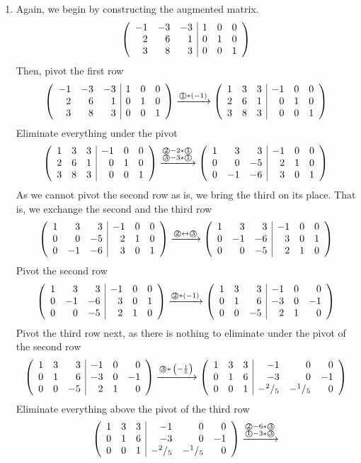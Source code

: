 \documentclass[8pt]{article} %
\newcommand{\myexplain}[3]{#1\xrightarrow{\text{#2}}#3}
\newcommand{\myexplainf}[4]{#1\xrightarrow{\begin{subarray}{c}\text{#2}\\\text{#3}\end{subarray}}#4}
\newcommand{\myfrac}[2]{^#1/_#2}
\begin{document}
\begin{description}
{\begin{enumerate}[label=(\alph*)]
			\item Again, we begin by constructing the augmented matrix.
				\[\left(\begin{array}{rrr|rrr}-1&-3&-3&1&0&0\\2&6&1&0&1&0\\3&8&3&0&0&1\end{array}\right)\]
				Then, pivot the first row
				\[\myexplain
				{\mymat{-1&-3&-3&1&0&0\\2&6&1&0&1&0\\3&8&3&0&0&1}}
				{\textcircled{1}$*(-1)$}
				{\mymat{1&3&3&-1&0&0\\2&6&1&0&1&0\\3&8&3&0&0&1}}
				\]
				Eliminate everything under the pivot
				\[\myexplainf
				{\mymat{1&3&3&-1&0&0\\2&6&1&0&1&0\\3&8&3&0&0&1}}
				{\textcircled{2}$-2*$\textcircled{1}}
				{\textcircled{3}$-3*$\textcircled{1}}
				{\mymat{1&3&3&-1&0&0\\0&0&-5&2&1&0\\0&-1&-6&3&0&1}}
				\]
				As we cannot pivot the second row as is, we bring the third on its place. That is, we exchange the second
				and the third row
				\[\myexplain
				{\mymat{1&3&3&-1&0&0\\0&0&-5&2&1&0\\0&-1&-6&3&0&1}}
				{\textcircled{2}$\leftrightarrow$\textcircled{3}}
				{\mymat{1&3&3&-1&0&0\\0&-1&-6&3&0&1\\0&0&-5&2&1&0}}
				\]
				Pivot the second row
				\[\myexplain
				{\mymat{1&3&3&-1&0&0\\0&-1&-6&3&0&1\\0&0&-5&2&1&0}}
				{\textcircled{2}$*(-1)$}
				{\mymat{1&3&3&-1&0&0\\0&1&6&-3&0&-1\\0&0&-5&2&1&0}}
				\]
				Pivot the third row next, as there is nothing to eliminate under the pivot of the second row
				\[\myexplain
				{\mymat{1&3&3&-1&0&0\\0&1&6&-3&0&-1\\0&0&-5&2&1&0}}
				{\textcircled{3}$*\left(-\frac{1}{5}\right)$}
				{\mymat{1&3&3&-1&0&0\\0&1&6&-3&0&-1\\0&0&1&-\myfrac{2}{5}&-\myfrac{1}{5}&0}}
				\]
				Eliminate everything above the pivot of the third row
				\[\myexplainf
				{\mymat{1&3&3&-1&0&0\\0&1&6&-3&0&-1\\0&0&1&-\myfrac{2}{5}&-\myfrac{1}{5}&0}}
				{\textcircled{2}$-6*$\textcircled{3}}
				{\textcircled{1}$-3*$\textcircled{3}}
\]
\end{enumerate}}
\end{description}
\end{document}
